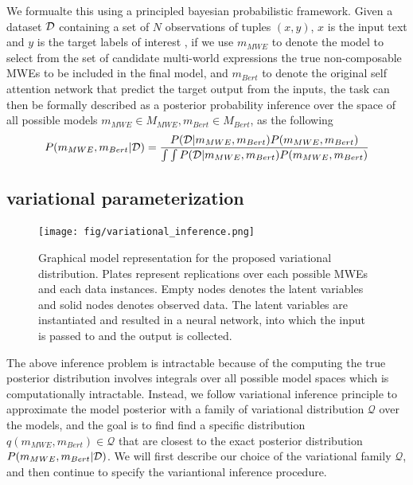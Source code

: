 We formualte this using a principled bayesian probabilistic framework. 
Given a dataset $\mathcal{D}$ containing a set of $N$ observations of tuples $(x,y)$,  $x$ is the input text and $y$ is the target labels of interest ,
if we use  $m_{MWE}$ to denote the model to select from the set of candidate multi-world expressions the true non-composable MWEs to be included in the final model, and 
$m_{Bert}$ to denote the original self attention network that predict the target output from the inputs, the task can then be formally described as a posterior probability inference over the space of all possible models $m_{MWE} \in M_{MWE}, m_{Bert} \in M_{Bert}$, as the following
\begin{align*}
\small
\begin{split}
    P(m_{MWE}, m_{Bert} | \mathcalD) = \frac{  P( \mathcalD | m_{MWE}, m_{Bert} ) P(m_{MWE}, m_{Bert})  }{ \int \int P( \mathcalD | m_{MWE}, m_{Bert} ) P(m_{MWE}, m_{Bert}) }\\
\end{split}
\end{align*}


\subsection{variational parameterization}


\begin{figure}[tb]
    \centering
    \texttt{[image: fig/variational\_inference.png]}
    \vspace{20pt}
    \caption{Graphical model representation for the proposed variational distribution. Plates represent replications over each possible MWEs and each data instances. Empty nodes denotes the latent variables and solid nodes denotes observed data. The latent variables are instantiated and resulted in a neural network, into which the input is passed to and the output is collected. }
    \label{fig:variational}
\end{figure}


The above inference problem is intractable because of the computing the true posterior distribution involves integrals over all possible model spaces which is computationally intractable. 
Instead, we follow  variational inference principle \cite{} to approximate the model posterior with a family of variational distribution $\mathcal{Q}$ over the models, and the goal is to find find a specific distribution $q(m_{MWE}, m_{Bert}) \in \mathcal{Q}$ that are closest to the exact posterior distribution $P(m_{MWE}, m_{Bert} | \mathcal{D})$.
We will first describe our choice of the variational family $\mathcal{Q}$, and then continue to specify the variantional inference procedure.


